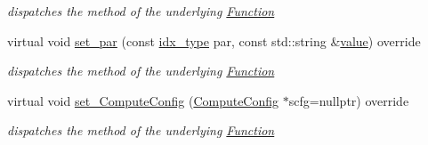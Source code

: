\begin{Indent}
\begin{DoxyCompactItemize}
\begin{DoxyCompactList}\small\item\em dispatches the method of the underlying \mbox{\hyperlink{class_s_m_spp__di__unipi__it_1_1_function}{Function}} \end{DoxyCompactList}\item 
\mbox{\label{class_s_m_spp__di__unipi__it_1_1_f_real_objective_ae6ba32f23de097cabe6288a463d44645}} 
virtual void \mbox{\hyperlink{class_s_m_spp__di__unipi__it_1_1_f_real_objective_ae6ba32f23de097cabe6288a463d44645}{set\+\_\+par}} (const \mbox{\hyperlink{class_s_m_spp__di__unipi__it_1_1_thin_compute_interface_aa3d710629ad8c434286726ad810c3b47}{idx\+\_\+type}} par, const std\+::string \&\mbox{\hyperlink{class_s_m_spp__di__unipi__it_1_1_f_real_objective_a5733803d5bd031be89b835e0bfe3b9c2}{value}}) override
\begin{DoxyCompactList}\small\item\em dispatches the method of the underlying \mbox{\hyperlink{class_s_m_spp__di__unipi__it_1_1_function}{Function}} \end{DoxyCompactList}\item 
\mbox{\label{class_s_m_spp__di__unipi__it_1_1_f_real_objective_afca3d4682961381f16cb8e0b5b88e81e}} 
virtual void \mbox{\hyperlink{class_s_m_spp__di__unipi__it_1_1_f_real_objective_afca3d4682961381f16cb8e0b5b88e81e}{set\+\_\+\+Compute\+Config}} (\mbox{\hyperlink{class_s_m_spp__di__unipi__it_1_1_compute_config}{Compute\+Config}} $\ast$scfg=nullptr) override
\begin{DoxyCompactList}\small\item\em dispatches the method of the underlying \mbox{\hyperlink{class_s_m_spp__di__unipi__it_1_1_function}{Function}} \end{DoxyCompactList}\end{DoxyCompactItemize}
\end{Indent}
